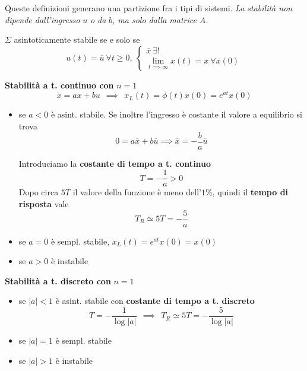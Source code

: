 Queste definizioni generano una partizione fra i tipi di sistemi. \textit{La stabilità non dipende dall'ingresso }$u$\textit{ o da }$b$\textit{, ma solo dalla matrice }$A$\textit{.}
\begin{thm}
	$\Sigma $ asintoticamente stabile se e solo se
	\begin{equation*}
		u\left(t\right) =\overline{u} \ \forall t\geq 0,\ \begin{cases}
		\overline{x} \ \exists !\\
		\lim _{t\implies \infty } x\left(t\right) =\overline{x} \ \forall x\left(0\right)
		\end{cases}
	\end{equation*}
\end{thm}
\textbf{Stabilità a t. continuo con }$n=1$\textbf{ }
\begin{equation*}
	\dot{x} =ax+bu\ \ \implies \ \ x_L\left(t\right) =\phi \left(t\right) x\left(0\right) =e^{at} x\left(0\right)
\end{equation*}
\begin{itemize}
	\item se $a< 0$ è asint. stabile. Se inoltre l'ingresso è costante il valore a equilibrio si trova\begin{equation*}
	      0=a\overline{x} +b\overline{u} \implies \overline{x} =-\frac{b}{a}\overline{u}
	\end{equation*}
	
	Introduciamo la \textbf{costante di tempo a t. continuo}\begin{equation*}
	\boxed{T=-\frac{1}{a}  >0}
	\end{equation*}Dopo circa $5T$ il valore della funzione è meno dell'$1\%$, quindi il \textbf{tempo di risposta} vale\begin{equation*}
	\boxed{T_R \simeq 5T=-\frac{5}{a}}
	\end{equation*}
	\item se $a=0$ è sempl. stabile, $x_L\left(t\right) =e^{at} x\left(0\right) =x\left(0\right)$
	\item se $a >0$ è instabile
\end{itemize}

\textbf{Stabilità a t. discreto con} $n=1$
\begin{itemize}
	\item se $\left| a\right| < 1$ è asint. stabile con \textbf{costante di tempo a t. discreto}\begin{equation*}
	      \boxed{T=-\frac{1}{\log\left| a\right| }} \ \ \implies \ \ \boxed{T_R \simeq 5T=-\frac{5}{\log\left| a\right| }}
	\end{equation*}
	\item se $\left| a\right| =1$ è sempl. stabile
	\item se $\left| a\right|  >1$ è instabile
\end{itemize}

